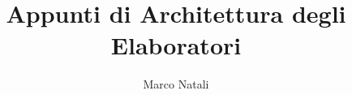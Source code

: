 \documentclass[a4paper]{report}
\begin{document}
\title{Appunti di Architettura degli Elaboratori}
\author{Marco Natali}
\maketitle

\end{document}
